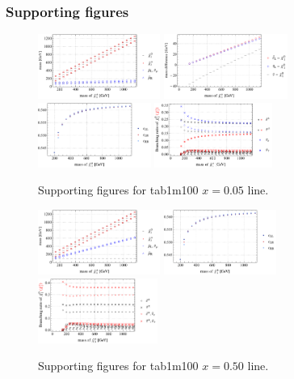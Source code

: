 \documentclass[a4paper,10pt,captions=tableheading,DIV=14]{scrartcl}
\numberwithin{equation}{section}
\begin{document}
\clearpage
\subsubsection{Supporting figures}
\begin{figure}[h!]\centering
 \includegraphics[height=60pt]{../plots/plot_tab1m100x005_mass.pdf}
 \includegraphics[height=60pt]{../plots/plot_tab1m100x005_massdiff.pdf}
 \includegraphics[height=60pt]{../plots/plot_tab1m100x005_cfactors.pdf}
 \includegraphics[height=60pt]{../plots/plot_tab1m100x005_br21.pdf}
\caption{Supporting figures for tab1m100 $x=0.05$ line.}
\end{figure}
\begin{figure}[h!]\centering
 \includegraphics[height=60pt]{../plots/plot_tab1m100x050_mass.pdf}
 \includegraphics[height=60pt]{../plots/plot_tab1m100x050_cfactors.pdf}
 \includegraphics[height=60pt]{../plots/plot_tab1m100x050_br21.pdf}
\caption{Supporting figures for tab1m100 $x=0.50$ line.}
\end{figure}
\end{document}
